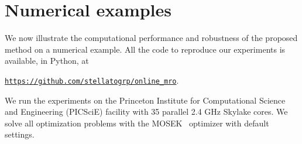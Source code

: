 \documentclass[12pt]{article}
\newcommand{\bnote}[1]{\textcolor{purple}{\textbf{[B: #1]}}}
\newcommand{\prob}{{\mathbf P}}
\newcommand{\eps}{\varepsilon^K}
\newcommand{\reviewChanges}[1]{{#1}}
\newcommand{\RC}[1]{\textcolor{black}{#1}}
\newcommand{\RC}[1]{\textcolor{blue}{#1}}
\begin{document}








\section{Numerical examples}
\label{sec:exampless}
We now illustrate the computational performance and robustness of the proposed method on a numerical example.
All the code to reproduce our experiments is available, \reviewChanges{in Python}, at
\begin{center}
{\tt \url{https://github.com/stellatogrp/online_mro}}.
\end{center}
We run the experiments on the Princeton Institute for Computational Science and Engineering (PICSciE) facility with 35 parallel 2.4 GHz Skylake cores.
We solve all optimization problems with the MOSEK~\cite{mosek} optimizer with default settings.
\end{document}
